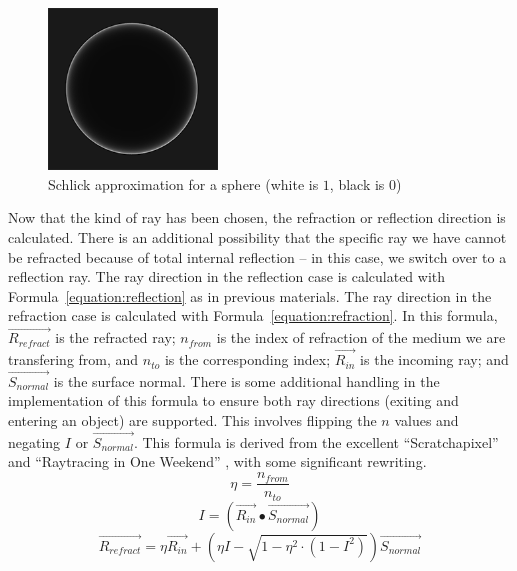 \vspace{0.3em}
\begin{figure}[htb]
  \centering
  \includegraphics[width=0.4\textwidth]{resources/fresnel}
  \caption{Schlick approximation for a sphere (white is $1$, black is $0$) \cite{learnopengltheory}}
\label{fig:rayterm-cpu_fresnel}
\end{figure}

Now that the kind of ray has been chosen, the refraction or reflection direction is calculated.
There is an additional possibility that the specific ray we have cannot be refracted because of total internal reflection -- in this case, we switch over to a reflection ray.
The ray direction in the reflection case is calculated with Formula~\ref{equation:reflection} as in previous materials.
The ray direction in the refraction case is calculated with Formula~\ref{equation:refraction}.
In this formula, $\vec{R_{refract}}$ is the refracted ray; $n_{from}$ is the index of refraction of the medium we are transfering from, and $n_{to}$ is the corresponding index; $\vec{R_{in}}$ is the incoming ray; and $\vec{S_{normal}}$ is the surface normal.
There is some additional handling in the implementation of this formula to ensure both ray directions (exiting and entering an object) are supported.
This involves flipping the $n$ values and negating $I$ or $\vec{S_{normal}}$.
This formula is derived from the excellent ``Scratchapixel'' \cite{prunier2017shading} and ``Raytracing in One Weekend'' \cite{shirley2016ray}, with some significant rewriting.
\begin{equation}
\label{equation:refraction_eta}
  \eta = \frac{n_{from}}{n_{to}}
\end{equation}
\begin{equation}
\label{equation:refraction_i}
  I = (\vec{R_{in}} \bullet \vec{S_{normal}})
\end{equation}
\begin{equation}
\label{equation:refraction}
  \vec{R_{refract}} = \eta\vec{R_{in}} + (\eta I - \sqrt{1 - \eta^2 \cdot (1 - I^2)})\vec{S_{normal}}
\end{equation}

